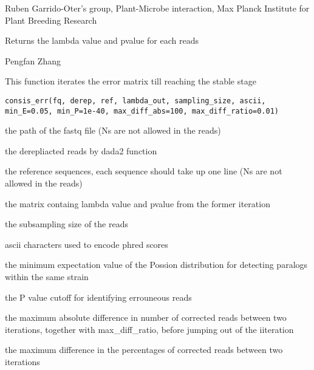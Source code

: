 \documentclass[a4paper]{book}
\begin{document}
%
\begin{Details}\relax
Ruben Garrido-Oter's group, Plant-Microbe interaction, Max Planck Institute for Plant Breeding Research
\end{Details}
%
\begin{Value}
Returns the lambda value and pvalue for each reads
\end{Value}
%
\begin{Author}\relax
Pengfan Zhang
\end{Author}
%
\begin{Description}\relax
This function iterates the error matrix till reaching the stable stage
\end{Description}
%
\begin{Usage}
\begin{verbatim}
consis_err(fq, derep, ref, lambda_out, sampling_size, ascii, min_E=0.05, min_P=1e-40, max_diff_abs=100, max_diff_ratio=0.01)
\end{verbatim}
\end{Usage}
%
\begin{Arguments}
\begin{ldescription}
\item[\code{fq}] the path of the fastq file (Ns are not allowed in the reads)

\item[\code{derep}] the derepliacted reads by dada2 function

\item[\code{ref}] the reference sequences, each sequence should take up one line (Ns are not allowed in the reads)

\item[\code{lambda\_out}] the matrix containg lambda value and pvalue from the former iteration

\item[\code{sampling\_size}] the subsampling size of the reads

\item[\code{ascii}] ascii characters used to encode phred scores

\item[\code{min\_E}] the minimum expectation value of the Possion distribution for detecting paralogs within the same strain

\item[\code{min\_P}] the P value cutoff for identifying errouneous reads

\item[\code{max\_diff\_abs}] the maximum absolute difference in number of corrected reads between two iterations, together with max\_diff\_ratio, before jumping out of the iiteration

\item[\code{max\_diff\_ratio}] the maximum difference in the percentages of corrected reads between two iterations
\end{ldescription}
\end{Arguments}
\end{document}
